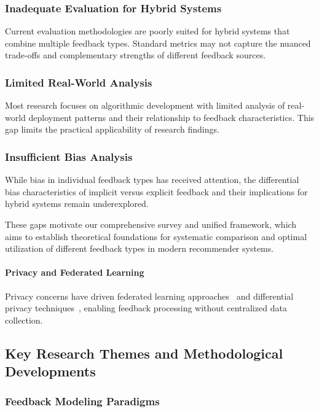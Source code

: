 \subsubsection{Inadequate Evaluation for Hybrid Systems}
Current evaluation methodologies are poorly suited for hybrid systems that combine multiple feedback types. Standard metrics may not capture the nuanced trade-offs and complementary strengths of different feedback sources.

\subsubsection{Limited Real-World Analysis}
Most research focuses on algorithmic development with limited analysis of real-world deployment patterns and their relationship to feedback characteristics. This gap limits the practical applicability of research findings.

\subsubsection{Insufficient Bias Analysis}
While bias in individual feedback types has received attention, the differential bias characteristics of implicit versus explicit feedback and their implications for hybrid systems remain underexplored.

These gaps motivate our comprehensive survey and unified framework, which aims to establish theoretical foundations for systematic comparison and optimal utilization of different feedback types in modern recommender systems.

\paragraph{Privacy and Federated Learning}
Privacy concerns have driven federated learning approaches~\cite{chai2020secure} and differential privacy techniques~\cite{jia2021privacy}, enabling feedback processing without centralized data collection.

\subsection{Key Research Themes and Methodological Developments}

\subsubsection{Feedback Modeling Paradigms}

